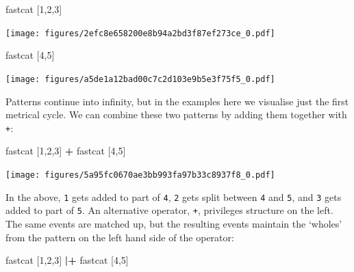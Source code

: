 \documentclass{nime-alternate} %
\newenvironment{Shaded}{\begin{snugshade}}{\end{snugshade}}
\newcommand{\DecValTok}[1]{\textcolor[rgb]{0.00,0.00,0.81}{#1}}
\newcommand{\NormalTok}[1]{#1}
\newcommand{\OperatorTok}[1]{\textcolor[rgb]{0.81,0.36,0.00}{\textbf{#1}}}
\begin{document}
\begin{Shaded}
\begin{Highlighting}[]
\NormalTok{fastcat [}\DecValTok{1}\NormalTok{,}\DecValTok{2}\NormalTok{,}\DecValTok{3}\NormalTok{]}
\end{Highlighting}
\end{Shaded}

\texttt{[image: figures/2efc8e658200e8b94a2bd3f87ef273ce\_0.pdf]}

\begin{Shaded}
\begin{Highlighting}[]
\NormalTok{fastcat [}\DecValTok{4}\NormalTok{,}\DecValTok{5}\NormalTok{]}
\end{Highlighting}
\end{Shaded}

\texttt{[image: figures/a5de1a12bad00c7c2d103e9b5e3f75f5\_0.pdf]}

Patterns continue into infinity, but in the examples here we visualise
just the first metrical cycle. We can combine these two patterns by
adding them together with \texttt{+}:

\begin{Shaded}
\begin{Highlighting}[]
\NormalTok{fastcat [}\DecValTok{1}\NormalTok{,}\DecValTok{2}\NormalTok{,}\DecValTok{3}\NormalTok{] }\OperatorTok{+}\NormalTok{ fastcat [}\DecValTok{4}\NormalTok{,}\DecValTok{5}\NormalTok{]}
\end{Highlighting}
\end{Shaded}

\texttt{[image: figures/5a95fc0670ae3bb993fa97b33c8937f8\_0.pdf]}

In the above, \texttt{1} gets added to part of \texttt{4}, \texttt{2}
gets split between \texttt{4} and \texttt{5}, and \texttt{3} gets added
to part of \texttt{5}. An alternative operator, \texttt{\textbar{}+},
privileges structure on the left. The same events are matched up, but
the resulting events maintain the `wholes' from the pattern on the left
hand side of the operator:

\begin{Shaded}
\begin{Highlighting}[]
\NormalTok{fastcat [}\DecValTok{1}\NormalTok{,}\DecValTok{2}\NormalTok{,}\DecValTok{3}\NormalTok{] }\OperatorTok{|+}\NormalTok{ fastcat [}\DecValTok{4}\NormalTok{,}\DecValTok{5}\NormalTok{]}
\end{Highlighting}
\end{Shaded}
\end{document}
